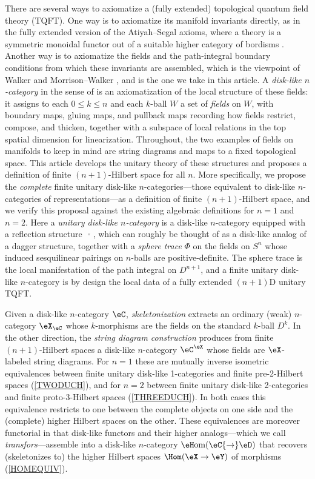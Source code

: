 \documentclass[12pt,reqno]{amsart}
\newcommand{\eFun}{{\eH}\mathrm{om}}
\newcommand{\psn}{\Phi}
\newcommand{\C}{\eC}
\newcommand{\D}{\eD}
\newcommand{\fcj}[1]{\overline{#1}}
\newcommand{\defn}[1]{\emph{#1}}
\begin{document}
There are several ways to axiomatize a (fully extended) topological quantum field theory (TQFT). One way is to axiomatize its manifold invariants directly, as in the fully extended version of the Atiyah--Segal axioms, where a theory is a symmetric monoidal functor out of a suitable higher category of bordisms \cite{Ati88,Seg04,BD95,Lurie09}. Another way is to axiomatize the fields and the path-integral boundary conditions from which these invariants are assembled, which is the viewpoint of Walker \cite{W06,W21} and Morrison--Walker \cite{MW12}, and is the one we take in this article. A \defn{disk-like $n$-category} in the sense of \cite{MW12} is an axiomatization of the local structure of these fields: it assigns to each $0\leq k\leq n$ and each $k$-ball $W$ a set of \defn{fields} on $W$, with boundary maps, gluing maps, and pullback maps recording how fields restrict, compose, and thicken, together with a subspace of local relations in the top spatial dimension for linearization. Throughout, the two examples of fields on manifolds to keep in mind are string diagrams and maps to a fixed topological space. This article develops the unitary theory of these structures and proposes a definition of finite $(n{+}1)$-Hilbert space for all $n$. More specifically, we propose the \emph{complete} finite unitary disk-like $n$-categories---those equivalent to disk-like $n$-categories of representations---as a definition of finite $(n{+}1)$-Hilbert space, and we verify this proposal against the existing algebraic definitions for $n=1$ and $n=2$. Here a \defn{unitary disk-like $n$-category} is a disk-like $n$-category equipped with a reflection structure $\fcj{\,\cdot\,}$, which can roughly be thought of as a disk-like analog of a dagger structure, together with a \defn{sphere trace} $\psn$ on the fields on $S^n$ whose induced sesquilinear pairings on $n$-balls are positive-definite. The sphere trace is the local manifestation of the path integral on $D^{n+1}$, and a finite unitary disk-like $n$-category is by design the local data of a fully extended $(n+1)$D unitary TQFT.

Given a disk-like $n$-category $\C$, \defn{skeletonization} extracts an ordinary (weak) $n$-category $\eX_\C$ whose $k$-morphisms are the fields on the standard $k$-ball $D^k$. In the other direction, the \defn{string diagram construction} produces from finite $(n+1)$-Hilbert spaces a disk-like $n$-category $\C^\eX$ whose fields are $\eX$-labeled string diagrams. For $n=1$ these are mutually inverse isometric equivalences between finite unitary disk-like 1-categories and finite pre-2-Hilbert spaces (\cref{TWODUCH}), and for $n=2$ between finite unitary disk-like 2-categories and finite proto-3-Hilbert spaces (\cref{THREEDUCH}). In both cases this equivalence restricts to one between the complete objects on one side and the (complete) higher Hilbert spaces on the other. These equivalences are moreover functorial in that disk-like functors and their higher analogs---which we call \defn{transfors}---assemble into a disk-like $n$-category $\eFun(\C{\to}\D)$ that recovers (skeletonizes to) the higher Hilbert spaces $\Hom(\eX\to\eY)$ of morphisms (\cref{HOMEQUIV}).
\end{document}
